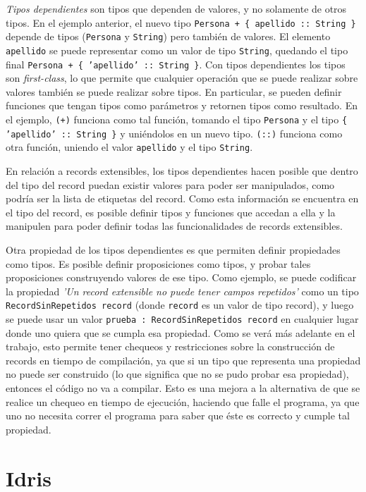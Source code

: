 \textit{Tipos dependientes} son tipos que dependen de valores, y no solamente de otros tipos. En el ejemplo anterior, el nuevo tipo \texttt{Persona + \{ apellido :: String \}} depende de tipos (\texttt{Persona} y \texttt{String}) pero también de valores. El elemento \texttt{apellido} se puede representar como un valor de tipo \texttt{String}, quedando el tipo final \texttt{Persona + \{ 'apellido' :: String \}}. Con tipos dependientes los tipos son \textit{first-class}, lo que permite que cualquier operación que se puede realizar sobre valores también se puede realizar sobre tipos. En particular, se pueden definir funciones que tengan tipos como parámetros y retornen tipos como resultado. En el ejemplo, \texttt{(+)} funciona como tal función, tomando el tipo \texttt{Persona} y el tipo \texttt{\{ 'apellido' :: String \}} y uniéndolos en un nuevo tipo. \texttt{(::)} funciona como otra función, uniendo el valor \texttt{apellido} y el tipo \texttt{String}.

En relación a records extensibles, los tipos dependientes hacen posible que dentro del tipo del record puedan existir valores para poder ser manipulados, como podría ser la lista de etiquetas del record. Como esta información se encuentra en el tipo del record, es posible definir tipos y funciones que accedan a ella y la manipulen para poder definir todas las funcionalidades de records extensibles.

Otra propiedad de los tipos dependientes es que permiten definir propiedades como tipos. Es posible definir proposiciones como tipos, y probar tales proposiciones construyendo valores de ese tipo. Como ejemplo, se puede codificar la propiedad \textit{'Un record extensible no puede tener campos repetidos'} como un tipo \texttt{RecordSinRepetidos record} (donde \texttt{record} es un valor de tipo record), y luego se puede usar un valor \texttt{prueba : RecordSinRepetidos record} en cualquier lugar donde uno quiera que se cumpla esa propiedad. Como se verá más adelante en el trabajo, esto permite tener chequeos y restricciones sobre la construcción de records en tiempo de compilación, ya que si un tipo que representa una propiedad no puede ser construido (lo que significa que no se pudo probar esa propiedad), entonces el código no va a compilar. Esto es una mejora a la alternativa de que se realice un chequeo en tiempo de ejecución, haciendo que falle el programa, ya que uno no necesita correr el programa para saber que éste es correcto y cumple tal propiedad.

\section{Idris}

